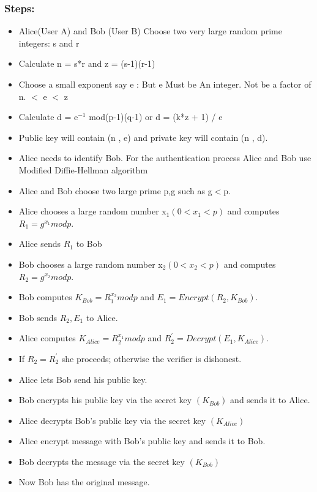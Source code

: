 \subsubsection{Steps:}
\vspace{-18pt}
\begin{itemize}
	\item Alice(User A) and Bob (User B) Choose two very large random prime integers: s and r
	\item Calculate n = s*r and z = (s-1)(r-1)
	\item Choose a small exponent say e :
	      \subitem But e Must be
	      \subitem An integer.
	      \subitem Not be a factor of n.
	       $<$ e $<$ z

	\item Calculate d = e$^{-1}$ mod(p-1)(q-1) or d = (k*z + 1) / e

	\item Public key will contain (n , e) and private key will contain
	      (n , d).
	\item Alice needs to identify Bob. For the authentication
	      process Alice and Bob use Modified Diffie-Hellman
	      algorithm
	\item Alice and Bob choose two large prime p,g such as g$<$p.
	\item Alice chooses a large random number x$_{1} (0<x_{1}<p)$ and computes $R_{1} = g^{x_{1}} mod p.$
	\item Alice sends $R_{1}$ to Bob
	\item Bob chooses a large random number x$_{2} (0<x_{2}<p)$ and computes $R_{2} = g^{x_{2}} mod p.$
	\item  Bob computes $K_{Bob} = R_{1}^{x_{2}} mod p$
	      and $E_{1}=Encrypt(R_{2},K_{Bob}).$
	\item Bob sends $R_{2},E_{1}$ to Alice.
	\item Alice computes $K_{Alice} = R_{2}^{x_{1}} mod p$
	      and $R^{'}_{2}=Decrypt(E_{1},K_{Alice}).$
	\item If $R_{2}=R^{'}_{2}$ she proceeds; otherwise the verifier is
	      dishonest.
	\item Alice lets Bob send his public key.
	\item Bob encrypts his public key via the secret key $(K_{Bob})$ and
	      sends it to Alice.
	\item Alice decrypts Bob's public key via the secret key $(K_{Alice})$
	\item Alice encrypt message with Bob’s public key and sends
	      it to Bob.
	\item Bob decrypts the message via the secret key $(K_{Bob})$
	\item Now Bob has the original message.



\end{itemize}
